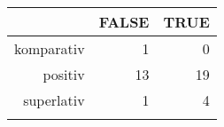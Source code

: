 \begin{tabular}{rrr}
  \lsptoprule
 & FALSE & TRUE \\ 
  \midrule
komparativ & 1 & 0 \\ 
  positiv & 13 & 19 \\ 
  superlativ & 1 & 4 \\ 
   \lspbottomrule
\end{tabular}
